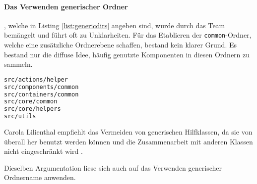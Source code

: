 \paragraph{Das Verwenden generischer Ordner}, welche in Listing \ref{list:genericdirs} angeben sind, wurde durch das Team bemängelt und führt oft zu Unklarheiten. Für das Etablieren der \lstinline|common|-Ordner, welche eine zusätzliche Ordnerebene schaffen, bestand kein klarer Grund. Es bestand nur die diffuse Idee, häufig genutzte Komponenten in diesen Ordnern zu sammeln. 

\begin{lstlisting}[language={sh}, label=list:genericdirs, caption=generische Ordner die innerhalb des FreeDesign-Projektes genutzt werden]
src/actions/helper
src/components/common
src/containers/common
src/core/common
src/core/helpers
src/utils
\end{lstlisting}

Carola Lilienthal empfiehlt das Vermeiden von generischen Hilfklassen, da sie von überall her benutzt werden können und die Zusammenarbeit mit anderen Klassen nicht eingeschränkt wird \autocite[vgl.][159]{Lilienthal2019}. 

Dieselben Argumentation liese sich auch auf das Verwenden generischer Ordnername anwenden. 

